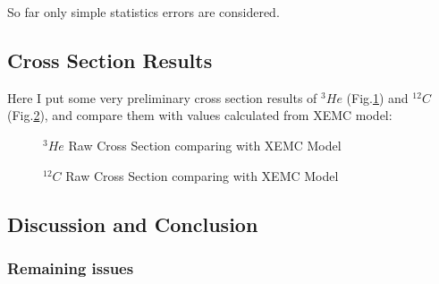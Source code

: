 \documentclass[a4paper,18.pt]{article}
\begin{document}
So far only simple statistics errors are considered. 

\subsection{Cross Section Results}

Here I put some very preliminary cross section results of $^{3}He$ (Fig.\ref{he3_xs}) and $^{12}C$ (Fig.\ref{c12_xs}), and compare them with values calculated from XEMC model:

\begin{figure}[!ht]
 \begin{center}
 \hfill
 \caption[$^{3}He$ Raw Cross Section comparing with XEMC Model]{$^{3}He$ Raw Cross Section comparing with XEMC Model}
 \label{he3_xs}
\end{center}
\end{figure}

\begin{figure}[!ht]
 \begin{center}
 \hfill
 \caption[$^{12}C$ Raw Cross Section comparing with XEMC Model]{$^{12}C$ Raw Cross Section comparing with XEMC Model}
 \label{c12_xs}
\end{center}
\end{figure}

\subsection{Discussion and Conclusion}

\subsubsection{Remaining issues}
 
\end{document}
